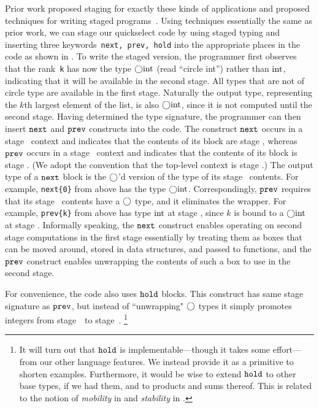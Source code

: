 Prior work proposed staging for exactly these kinds of applications
and proposed techniques for writing staged
programs~\cite{staging}. Using techniques essentially the same as
prior work, we can stage our quickselect code by using staged typing
and inserting three keywords~\texttt{next, prev, hold} into the
appropriate places in the code as shown in . To
write the staged version, the programmer first observes that the
rank~\texttt{k} has now the type $\bigcirc{\rm int}$ (read ``circle int'')
rather than ${\rm int}$, indicating that it will be available in the
second stage.  All types that are not of circle type are available in
the first stage.  Naturally the output type, representing the $k$th
largest element of the list, is also $\bigcirc{\rm int}$, since it is not
computed until the second stage. Having determined the type signature,
the programmer can then insert ${\tt next}$ and ${\tt prev}$ constructs into the
code. The construct ${\tt next}$ occurs in a stage \bbone\ context and
indicates that the contents of its block are stage \bbtwo, whereas
${\tt prev}$ occurs in a stage \bbtwo\ context and indicates that the
contents of its block is stage \bbone.  (We adopt the convention that
the top-level context is stage \bbone.)  The output type of a ${\tt next}$
block is the $\bigcirc$'d version of the type of its stage
\bbtwo\ contents.  For example, \verb|next{0}| from above has the type
$\bigcirc{\rm int}$.  Correspondingly, ${\tt prev}$ requires that its stage
\bbone\ contents have a $\bigcirc$ type, and it eliminates the wrapper.
For example, \verb|prev{k}| from above has type ${\rm int}$ at stage
\bbtwo, since $k$ is bound to a $\bigcirc{\rm int}$ at stage
\bbone. Informally speaking, the
${\tt next}$ construct enables operating on second stage computations in
the first stage essentially by treating them as boxes that can be
moved around, stored in data structures, and passed to functions, and
the ${\tt prev}$ construct enables unwrapping the contents of such a box to
use in the second stage. 



For convenience, the code also uses ${\tt hold}$ blocks.  This construct
has same stage signature as ${\tt prev}$, but instead of ``unwrapping"
$\bigcirc$ types it simply promotes integers from stage~\bbone\ to
stage~\bbtwo.
\footnote{It will turn out that ${\tt hold}$ is implementable---though it takes some effort---from our other language features.
We instead provide it as a primitive to shorten examples.  
Furthermore, it would be wise to extend ${\tt hold}$ to other base types, if we had them, and to products and sums thereof.
This is related to the notion of {\em mobility} in \cite{murphy05} and
{\em stability} in \cite{krishnaswami13}.} 

